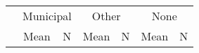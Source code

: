 \begin{tabular}{l c c c c c c}
\toprule
 & \multicolumn{2}{c}{Municipal} & \multicolumn{2}{c}{Other} & \multicolumn{2}{c}{None} \\
 & Mean & N & Mean & N & Mean & N \\
\midrule
\bottomrule
\end{tabular}
